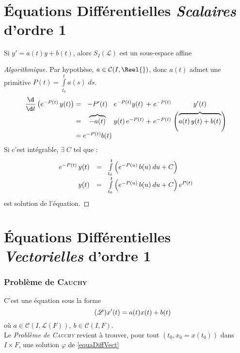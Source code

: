 \documentclass[11pt,a4paper,fleqn,pdftex]{report}
\begin{document}
\section{Équations Différentielles \emph{Scalaires} d'ordre 1}
\begin{theorem}
Si $y'=a(t) y + b(t)$, alors $S_I(\mathscr{L})$ est un sous-espace affine
\end{theorem}
\begin{proof}[Algorithmique]\label{ResolEquDiffScal1}
Par hypothèse, $a \in \mathcal{C}(I,\Reel{})$, donc $a(t)$ admet une primitive $P(t)=\int \limits_{t_0}^t a(s) \; ds$.
\[\arraycolsep=1.4pt\def\arraystretch{1}
\begin{array}{r c c l l c c}
\dfrac{\d}{\d t}\left( e^{-P(t)}\, y(t) \right) &=& -P'(t) & e^{-P(t)}y(t) &+& e^{-P(t)}& y'(t)\\
&=& \overbrace{-a(t)}&y(t)\, e^{-P(t)}&+& e^{-P(t)} &\left( \overbrace{\vphantom{{3^3}^3} a(t)\, y(t) +b(t)} \right)\\
&=& e^{-P(t)}b(t)\\
\end{array}\]
Si c'est intégrable, $\exists \; C$ tel que :
\[
\begin{array}{r c l}
e^{-P(t)}\, y(t) &=& \int \limits_{t_0}^t \left( \vphantom{{3^3}^3} e^{-P(u)}\, b(u) \: du + C \right)\\
y(t) &=& \int\limits_{t_0}^t \left( \vphantom{{3^3}^3} e^{-P(u)}\, b(u) \: du + C \right) e^{P(t)}
\end{array}
\] est solution de l'équation.
\end{proof}
%
\section{Équations Différentielles \emph{Vectorielles} d'ordre 1}
\subsubsection{Problème de \textsc{Cauchy}} %
\label{ssub:probleme_de_Cauchy}
\begin{dfn}
    C'est une équation sous la forme 
\begin{equation}\label{equaDiffVect}\tag{$\mathscr{L}$}
    x'(t) = a(t) x(t) + b(t)
\end{equation}
où $a \in \mathcal{C}\left( I,\mathscr{L}(F)\right), \: b\in \mathcal{C}(I,F)$. \\Le \emph{Problème de \textsc{Cauchy}}  revient à trouver, pour tout $(t_0,x_0=x(t_0))$ dans $I \times F$, une solution $\varphi$ de \eqref{equaDiffVect}
\end{dfn}
\end{document}
